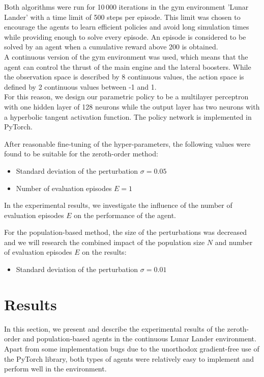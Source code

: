\documentclass[10pt]{article}
\begin{document}
Both algorithms were run for 10\,000 iterations in the gym environment 'Lunar Lander' with a time limit of 500 steps per episode.
This limit was chosen to encourage the agents to learn efficient policies and avoid long simulation times while providing enough
to solve every episode. An episode is considered to be solved by an agent when a cumulative reward above 200 is obtained.\\
A continuous version of the gym environment was used, which means that the agent can control the thrust of the main engine and the lateral boosters. While the observation space is described by 8 continuous values, the action space is defined by 2 continuous values between -1 and 1.\cite{gym}\\
For this reason, we design our parametric policy to be a multilayer perceptron with one hidden layer of
128 neurons while the output layer has two neurons with a hyperbolic tangent activation function.
The policy network is implemented in PyTorch.\cite{pytorch}

After reasonable fine-tuning of the hyper-parameters, the following values were found to be suitable for the zeroth-order method:
\begin{itemize}
    \item Standard deviation of the perturbation $\sigma=0.05$
    \item Number of evaluation episodes $E = 1$
\end{itemize}
In the experimental results, we investigate the influence of the number of evaluation episodes $E$ on the performance of the agent.

For the population-based method, the size of the perturbations was decreased and we will research the combined impact of the population size
$N$ and number of evaluation episodes $E$ on the results:
\begin{itemize}
    \item Standard deviation of the perturbation $\sigma=0.01$
\end{itemize}

\section{Results}

In this section, we present and describe the experimental results of the zeroth-order and population-based
agents in the continuous Lunar Lander environment.
Apart from some implementation bugs due to the unorthodox gradient-free use of the PyTorch library, both types
of agents were relatively easy to implement and perform well in the environment.
\end{document}
